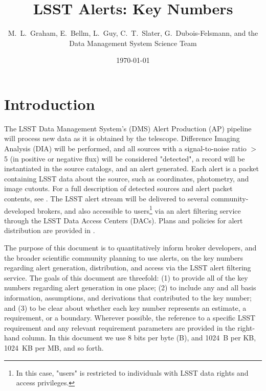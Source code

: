 \documentclass[DM,authoryear,toc]{lsstdoc}
\title[Alerts Key Numbers]{LSST Alerts: Key Numbers}
\author{%
M.~L.~Graham, E.~Bellm, L.~Guy, C.~T.~Slater, G.~Dubois-Felsmann, and the \gls{Data Management System} Science Team
}
\date{\today}
\begin{document}
\maketitle

\section{Introduction} \label{sec:intro}

The \gls{LSST} \gls{Data Management System}'s (\gls{DMS}) \gls{Alert Production} (\gls{AP}) \gls{pipeline} will process new data as it is obtained by the telescope. 
Difference Imaging Analysis (\gls{DIA}) will be performed, and all sources with a signal-to-noise ratio $>$5 (in positive or negative \gls{flux}) will be considered "detected", a record will be instantiated in the source catalogs, and an alert generated.
Each alert is a packet containing \gls{LSST} data about the source, such as coordinates, photometry, and image cutouts. 
For a full description of detected sources and alert packet contents, see . 
The \gls{LSST} alert stream will be delivered to several community-developed brokers, and also accessible to users\footnote{In this case, "users" is restricted to individuals with \gls{LSST} data rights and access privileges.} via an alert filtering service through the \gls{LSST} Data Access Centers (DACs). 
Plans and policies for alert distribution are provided in . 

The purpose of this document is to quantitatively inform broker developers, and the broader scientific community planning to use alerts, on the key numbers regarding alert generation, distribution, and access via the \gls{LSST} alert filtering service. 
The goals of this document are threefold: (1) to provide all of the key numbers regarding alert generation in one place; (2) to include any and all basis information, assumptions, and derivations that contributed to the key number; and (3) to be clear about whether each key number represents an estimate, a requirement, or a boundary. 
Wherever possible, the reference to a specific \gls{LSST} requirement and any relevant requirement parameters are provided in the right-hand column. 
In this document we use 8 bits per byte (\gls{B}), and 1024~B per \gls{KB}, 1024~KB per \gls{MB}, and so forth.
\end{document}
